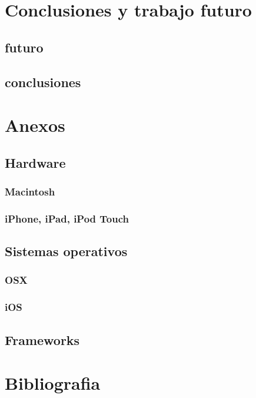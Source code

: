 
\chapter{Conclusiones y trabajo futuro}
	\section{futuro}
	\section{conclusiones}
	
	
\chapter{Anexos}
	\section{Hardware}
		\subsection{Macintosh}
		\subsection{iPhone, iPad, iPod Touch}
	\section{Sistemas operativos}
		\subsection{OSX}
		\subsection{iOS}
	\section{Frameworks}
	
\chapter{Bibliografia}
